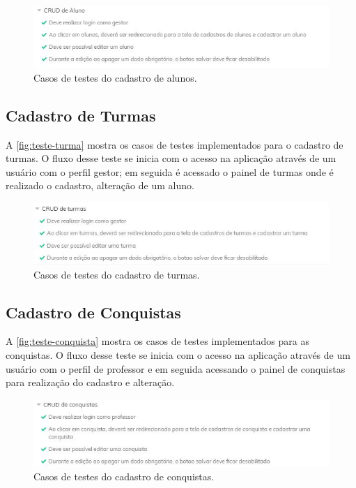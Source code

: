 \begin{figure}[htb]
    \centering
	\includegraphics[width=16cm]{imagens/tstAluno.JPG}
	\caption{\label{fig:teste-aluno} Casos de testes do cadastro de alunos.}
\end{figure}

\subsection{Cadastro de Turmas}
A \autoref{fig:teste-turma} mostra os casos de testes implementados para o cadastro de turmas. O fluxo desse teste se inicia com o acesso na aplicação através de um usuário com o perfil gestor; em seguida é acessado o painel de turmas onde é realizado o cadastro, alteração de um aluno.

\begin{figure}[htb]
    \centering
	\includegraphics[width=16cm]{imagens/tstTurma.JPG}
	\caption{\label{fig:teste-turma} Casos de testes do cadastro de turmas.}
\end{figure}

\subsection{Cadastro de Conquistas}
A \autoref{fig:teste-conquista} mostra os casos de testes implementados para as conquistas. O fluxo desse teste se inicia com o acesso na aplicação através de um usuário com o perfil de professor e em seguida acessando o painel de  conquistas para realização do cadastro e alteração. 

\begin{figure}[htb]
    \centering
	\includegraphics[width=16cm]{imagens/tstConquista.JPG}
	\caption{\label{fig:teste-conquista} Casos de testes do cadastro de conquistas.}
\end{figure}

